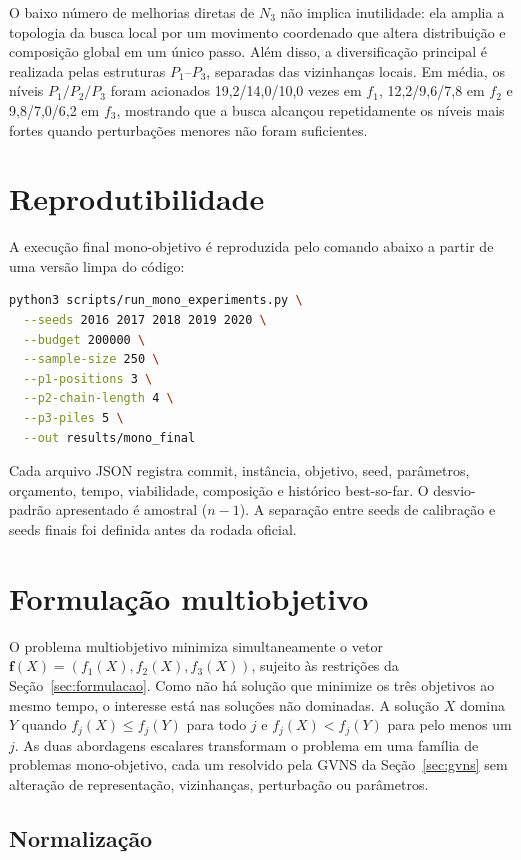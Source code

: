 \documentclass[10pt,twocolumn,a4paper]{article}
\begin{document}
O baixo número de melhorias diretas de $N_3$ não implica inutilidade: ela amplia a topologia da busca local por um movimento coordenado que altera distribuição e composição global em um único passo. Além disso, a diversificação principal é realizada pelas estruturas $P_1$--$P_3$, separadas das vizinhanças locais. Em média, os níveis $P_1/P_2/P_3$ foram acionados 19,2/14,0/10,0 vezes em $f_1$, 12,2/9,6/7,8 em $f_2$ e 9,8/7,0/6,2 em $f_3$, mostrando que a busca alcançou repetidamente os níveis mais fortes quando perturbações menores não foram suficientes.

\section{Reprodutibilidade}
\label{sec:reprodutibilidade}

A execução final mono-objetivo é reproduzida pelo comando abaixo a partir de uma versão limpa do código:
\begin{lstlisting}[language=bash]
python3 scripts/run_mono_experiments.py \
  --seeds 2016 2017 2018 2019 2020 \
  --budget 200000 \
  --sample-size 250 \
  --p1-positions 3 \
  --p2-chain-length 4 \
  --p3-piles 5 \
  --out results/mono_final
\end{lstlisting}

Cada arquivo JSON registra commit, instância, objetivo, seed, parâmetros, orçamento, tempo, viabilidade, composição e histórico best-so-far. O desvio-padrão apresentado é amostral ($n-1$). A separação entre seeds de calibração e seeds finais foi definida antes da rodada oficial.

\section{Formulação multiobjetivo}
\label{sec:formulacao_multi}

O problema multiobjetivo minimiza simultaneamente o vetor $\mathbf{f}(X) = (f_1(X), f_2(X), f_3(X))$, sujeito às restrições da Seção~\ref{sec:formulacao}. Como não há solução que minimize os três objetivos ao mesmo tempo, o interesse está nas soluções não dominadas. A solução $X$ domina $Y$ quando $f_j(X) \le f_j(Y)$ para todo $j$ e $f_j(X) < f_j(Y)$ para pelo menos um $j$. As duas abordagens escalares transformam o problema em uma família de problemas mono-objetivo, cada um resolvido pela GVNS da Seção~\ref{sec:gvns} sem alteração de representação, vizinhanças, perturbação ou parâmetros.

\subsection{Normalização}
\end{document}
